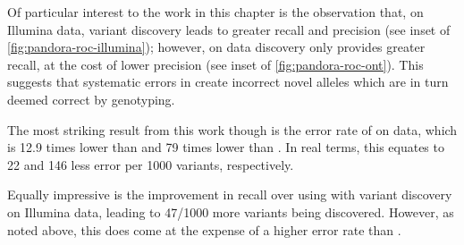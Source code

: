 Of particular interest to the work in this chapter is the observation that, on Illumina data, \denovo{} variant discovery leads to greater recall and precision (see inset of \autoref{fig:pandora-roc-illumina}); however, on \ont{} data \denovo{} discovery only provides greater recall, at the cost of lower precision (see inset of \autoref{fig:pandora-roc-ont}). This suggests that systematic errors in \ont{} create incorrect novel alleles which are in turn deemed correct by genotyping.

The most striking result from this work though is the error rate of \pandora{} on \ont{} data, which is 12.9 times lower than  and 79 times lower than . In real terms, this equates to 22 and 146 less error per 1000 variants, respectively.

Equally impressive is the improvement in recall over  using \pandora{} with variant discovery on Illumina data, leading to 47/1000 more variants being discovered. However, as noted above, this does come at the expense of a higher error rate than .

